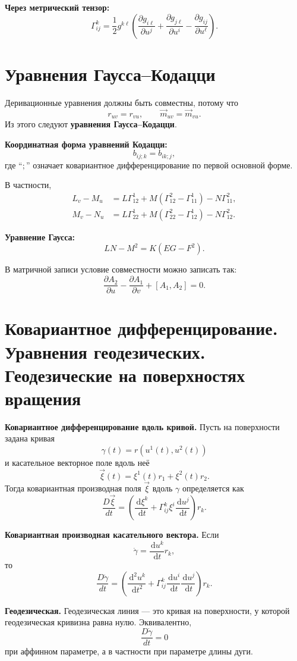 \documentclass[12pt,a4paper]{article}
\newcommand{\dd}{\,\mathrm{d}}
\begin{document}
\textbf{Через метрический тензор:}
\[
\Gamma^k_{ij}
=
\frac12 g^{k\ell}
\left(
\frac{\partial g_{i\ell}}{\partial u^j}
+
\frac{\partial g_{j\ell}}{\partial u^i}
-
\frac{\partial g_{ij}}{\partial u^\ell}
\right).
\]

\section{Уравнения Гаусса--Кодацци}

Деривационные уравнения должны быть совместны, потому что
\[
r_{uv}=r_{vu},
\qquad
\vec{m}_{uv}=\vec{m}_{vu}.
\]
Из этого следуют \textbf{уравнения Гаусса--Кодацци}.

\textbf{Координатная форма уравнений Кодацци:}
\[
b_{ij;k}=b_{ik;j},
\]
где ``$;$'' означает ковариантное дифференцирование по первой основной форме.

В частности,
\begin{align*}
L_v-M_u &= L\Gamma_{12}^1+M(\Gamma_{12}^2-\Gamma_{11}^1)-N\Gamma_{11}^2,\\
M_v-N_u &= L\Gamma_{22}^1+M(\Gamma_{22}^2-\Gamma_{12}^1)-N\Gamma_{12}^2.
\end{align*}

\textbf{Уравнение Гаусса:}
\[
LN-M^2=K(EG-F^2).
\]

В матричной записи условие совместности можно записать так:
\[
\frac{\partial A_2}{\partial u}-\frac{\partial A_1}{\partial v}+[A_1,A_2]=0.
\]

\section{Ковариантное дифференцирование. Уравнения геодезических. Геодезические на поверхностях вращения}

\textbf{Ковариантное дифференцирование вдоль кривой.}
Пусть на поверхности задана кривая
\[
\gamma(t)=r(u^1(t),u^2(t))
\]
и касательное векторное поле вдоль неё
\[
\vec{\xi}(t)=\xi^1(t)r_1+\xi^2(t)r_2.
\]
Тогда ковариантная производная поля $\vec{\xi}$ вдоль $\gamma$ определяется как
\[
\frac{D\vec{\xi}}{dt}
=
\left(
\frac{\dd \xi^k}{\dd t}
+
\Gamma^k_{ij}\xi^i\frac{\dd u^j}{\dd t}
\right)r_k.
\]

\textbf{Ковариантная производная касательного вектора.}
Если
\[
\dot{\gamma}
=
\frac{\dd u^k}{\dd t}r_k,
\]
то
\[
\frac{D\dot{\gamma}}{dt}
=
\left(
\frac{\dd^2u^k}{\dd t^2}
+
\Gamma^k_{ij}\frac{\dd u^i}{\dd t}\frac{\dd u^j}{\dd t}
\right)r_k.
\]

\textbf{Геодезическая.}
Геодезическая линия --- это кривая на поверхности, у которой геодезическая
кривизна равна нулю. Эквивалентно,
\[
\frac{D\dot{\gamma}}{dt}=0
\]
при аффинном параметре, а в частности при параметре длины дуги.
\end{document}
